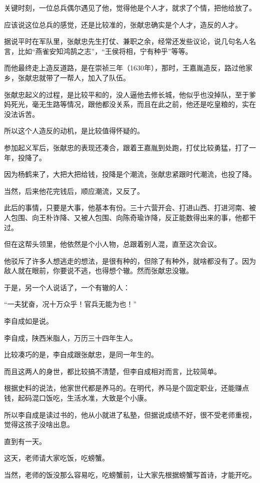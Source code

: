 \begin{multicols}{\theparacolNo}
关键时刻，一位总兵偶尔遇见了他，觉得他是个人才，就求了个情，把他给放了。

应该说这位总兵的感觉，还是比较准的，张献忠确实是个人才，造反的人才。

据说平时在军队里，张献忠先生打仗、兼职之余，经常还发些议论，说几句名人名言，比如“燕雀安知鸿鹄之志”，“王侯将相，宁有种乎”等等。

而他最终走上造反道路，是在崇祯三年（1630年），那时，王嘉胤造反，路过他家乡，张献忠就带了一帮人，加入了队伍。

张献忠起义的过程，是比较平和的，没人逼他去修长城，他似乎也没掉队，至于爹妈死光，毫无生路等情况，跟他都没关系，而且在此之前，他还是吃皇粮的，实在没法诉苦。

所以这个人造反的动机，是比较值得怀疑的。

参加起义军后，张献忠的表现还凑合，跟着王嘉胤到处跑，打仗比较勇猛，打了一年，投降了。

因为杨鹤来了，大把大把给钱，投降是个潮流，张献忠紧跟时代潮流，也投了降。

当然，后来他花完钱后，顺应潮流，又反了。

此后的事情，只要是大事，他基本有份。三十六营开会、打进山西、打进河南、被人包围、向王朴诈降、又被人包围、向陈奇瑜诈降，反正能数得出来的事，他都干过。

但在这帮头领里，他依然是个小人物，总跟着别人混，直至这次会议。

他驳斥了许多人想逃走的想法，是很有种的，但除了有种外，就啥都没有了。因为敌人就在眼前，你要说不逃，也得想个辙。然而张献忠没辙。

于是，另一个人说话了，一个有辙的人：

“一夫犹奋，况十万众乎！官兵无能为也！”

李自成如是说。

李自成，陕西米脂人，万历三十四年生人。

比较凑巧的是，李自成跟张献忠，是同一年生的。

而且这两人的身世，都比较搞不清楚，但李自成相对而言，比较简单。

根据史料的说法，他家世代都是养马的。在明代，养马是个固定职业，还能赚点钱，起码混口饭吃，生活水准，大致是个小康。

所以李自成是读过书的，他从小就进了私塾，但据说成绩不好，很不受老师重视，觉得这孩子没啥出息。

直到有一天。

这天，老师请大家吃饭，吃螃蟹。

当然，老师的饭没那么容易吃，吃螃蟹前，让大家先根据螃蟹写首诗，才能开吃。


\end{multicols}
